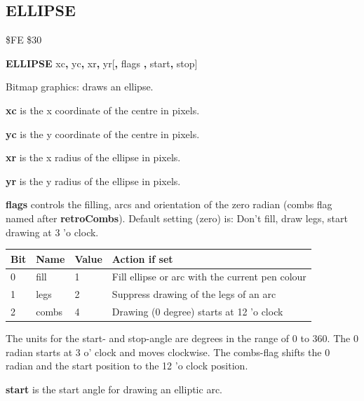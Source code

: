 \subsection{ELLIPSE}
\begin{description}[leftmargin=2cm,style=nextline]
\item [Token:]    \$FE \$30

\item [Format:]   {\bf ELLIPSE} xc{\bf,} yc{\bf,} xr{\bf,} yr[{\bf,} flags {\bf,} start{\bf,} stop]

\item [Usage:]    Bitmap graphics: draws an ellipse.

                  {\bf xc} is the x coordinate of the centre in pixels.

                  {\bf yc} is the y coordinate of the centre in pixels.

                  {\bf xr} is the x radius of the ellipse in pixels.

                  {\bf yr} is the y radius of the ellipse in pixels.

                  {\bf flags} controls the filling, arcs and orientation of the zero radian (combs flag named after {\bf retroCombs}). Default setting (zero) is: Don't fill, draw legs, start drawing at 3 'o clock.

                  {\setlength{\tabcolsep}{1.5mm}
                  \begin{tabular}{|l|l|l|l|}
                  \hline
                  {\bf Bit}  & {\bf Name} & {\bf Value} & {\bf Action if set} \\
                  \hline
                  0 & fill  & 1  & Fill ellipse or arc with the current pen colour \\
                  1 & legs  & 2  & Suppress drawing of the legs of an arc \\
                  2 & combs & 4  & Drawing (0 degree) starts at 12 'o clock \\
                  \hline
                  \end{tabular}
                  }

                  The units for the start- and stop-angle are degrees in the range of 0 to 360. The 0 radian starts at 3 o' clock and moves clockwise. The combs-flag shifts the 0 radian and the start position to the 12 'o clock position.

                  {\bf start} is the start angle for drawing an elliptic arc.


\end{description}
